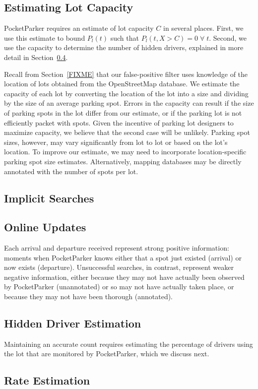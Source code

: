 \subsection{Estimating Lot Capacity}
\label{subsec-capacity}

PocketParker requires an estimate of lot capacity $C$ in several places.
First, we use this estimate to bound $P_l(t)$ such that $P_l(t, X > C) =
0\;\forall\;t$. Second, we use the capacity to determine the number of hidden
drivers, explained in more detail in Section~\ref{subsec-hidden}.

Recall from Section~\ref{FIXME} that our false-positive filter uses knowledge
of the location of lots obtained from the OpenStreetMap database. We estimate
the capacity of each lot by converting the location of the lot into a size
and dividing by the size of an average parking spot. Errors in the capacity
can result if the size of parking spots in the lot differ from our estimate,
or if the parking lot is not efficiently packet with spots. Given the
incentive of parking lot designers to maximize capacity, we believe that the
second case will be unlikely. Parking spot sizes, however, may vary
significantly from lot to lot or based on the lot's location. To improve our
estimate, we may need to incorporate location-specific parking spot size
estimates. Alternatively, mapping databases may be directly annotated with
the number of spots per lot.

\subsection{Implicit Searches}
\label{subsec-synthetic}

\subsection{Online Updates}
\label{subsec-online}

Each arrival and departure received represent strong positive information:
moments when PocketParker knows either that a spot just existed (arrival) or
now exists (departure). Unsuccessful searches, in contrast, represent weaker
negative information, either because they may not have actually been observed
by PocketParker (unannotated) or so may not have actually taken place, or
because they may not have been thorough (annotated).

\subsection{Hidden Driver Estimation}
\label{subsec-hidden}

Maintaining an accurate count requires estimating the
percentage of drivers using the lot that are monitored by PocketParker, which
we discuss next.

\subsection{Rate Estimation}
\label{subsec-rates}

